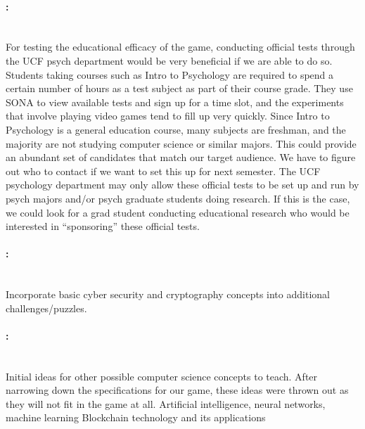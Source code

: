 \paragraph{:} ~\\
For testing the educational efficacy of the game, conducting official tests through the UCF psych department would be very beneficial if we are able to do so.
Students taking courses such as Intro to Psychology are required to spend a certain number of hours as a test subject as part of their course grade. They use SONA to view available tests and sign up for a time slot, and the experiments that involve playing video games tend to fill up very quickly.
Since Intro to Psychology is a general education course, many subjects are freshman, and the majority are not studying computer science or similar majors. This could provide an abundant set of candidates that match our target audience.
We have to figure out who to contact if we want to set this up for next semester.
The UCF psychology department may only allow these official tests to be set up and run by psych majors and/or psych graduate students doing research. If this is the case, we could look for a grad student conducting educational research who would be interested in “sponsoring” these official tests.



\paragraph{:} ~\\
Incorporate basic cyber security and cryptography concepts into additional challenges/puzzles.

\paragraph{:} ~\\
Initial ideas for other possible computer science concepts to teach. After narrowing down the specifications for our game, these ideas were thrown out as they will not fit in the game at all.
Artificial intelligence, neural networks, machine learning
Blockchain technology and its applications



